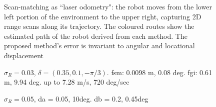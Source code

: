 \begin{figure}[]\centering
  
  \vspace{-2cm}
  \caption{\small Scan-matching as ``laser odometry": the robot moves from the
           lower left portion of the environment to the upper right, capturing
           2D range scans along its trajectory. The coloured routes show the
           estimated path of the robot derived from each method. The proposed
           method's error is invariant to angular and locational displacement}
  \label{}
\end{figure}

\begin{figure}[]\centering
  
  \caption{$\sigma_R = 0.03$, $\delta = (0.35, 0.1, -\pi/3)$. fsm: 0.0098 m, 0.08 deg.
  fgi: 0.61 m, 9.94 deg. up to 7.28 m/s, 720 deg/sec}
  \label{}
\end{figure}

\begin{figure}[]\centering
  
  \caption{$\sigma_R = 0.05$, da = 0.05, 10deg. db = 0.2, 0.45deg}
  \label{}
\end{figure}

\begin{figure}[]\centering
  
  \caption{}
  \label{}
\end{figure}
